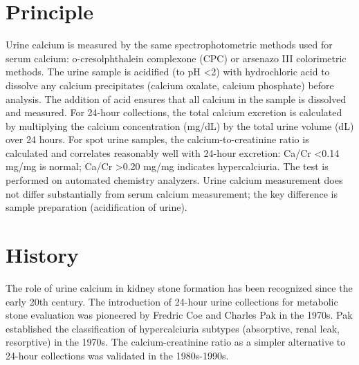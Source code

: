 \section*{Principle}
Urine calcium is measured by the same spectrophotometric methods used for serum calcium: o-cresolphthalein complexone (CPC) or arsenazo III colorimetric methods. The urine sample is acidified (to pH <2) with hydrochloric acid to dissolve any calcium precipitates (calcium oxalate, calcium phosphate) before analysis. The addition of acid ensures that all calcium in the sample is dissolved and measured. For 24-hour collections, the total calcium excretion is calculated by multiplying the calcium concentration (mg/dL) by the total urine volume (dL) over 24 hours. For spot urine samples, the calcium-to-creatinine ratio is calculated and correlates reasonably well with 24-hour excretion: Ca/Cr <0.14 mg/mg is normal; Ca/Cr >0.20 mg/mg indicates hypercalciuria. The test is performed on automated chemistry analyzers. Urine calcium measurement does not differ substantially from serum calcium measurement; the key difference is sample preparation (acidification of urine).

\section*{History}
The role of urine calcium in kidney stone formation has been recognized since the early 20th century. The introduction of 24-hour urine collections for metabolic stone evaluation was pioneered by Fredric Coe and Charles Pak in the 1970s. Pak established the classification of hypercalciuria subtypes (absorptive, renal leak, resorptive) in the 1970s. The calcium-creatinine ratio as a simpler alternative to 24-hour collections was validated in the 1980s-1990s.

